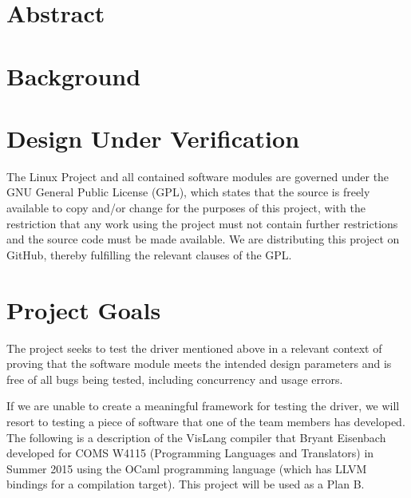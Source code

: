\documentclass{article}
\begin{document}
    \section{Abstract}
    
    
    \section{Background}
    
    
    
    \section{Design Under Verification}
    
    \par
    The Linux Project and all contained software modules are governed under the GNU General
    Public License (GPL), which states that the source is freely available to copy and/or change
    for the purposes of this project, with the restriction that any work using the project
    must not contain further restrictions and the source code must be made available.
    We are distributing this project on GitHub, thereby fulfilling the relevant clauses of the GPL.

    \section{Project Goals}
    The project seeks to test the driver mentioned above in a relevant context of proving
    that the software module meets the intended design parameters and is free of all bugs
    being tested, including concurrency and usage errors.
    \par
    If we are unable to create a meaningful framework for testing the driver, we
    will resort to testing a piece of software that one of the team members has developed.
    The following is a description of the VisLang compiler that Bryant Eisenbach developed
    for COMS W4115 (Programming Languages and Translators) in Summer 2015 using the OCaml
    programming language (which has LLVM bindings for a compilation target).
    This project will be used as a Plan B.
    \par
    
    
    \pagebreak
    \small
    {}
    
\end{document}
